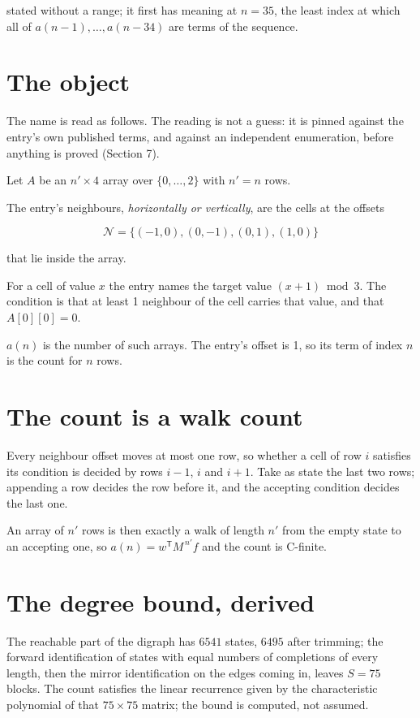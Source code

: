 \documentclass[11pt]{article}
\theoremstyle{definition}
\begin{document}
stated without a range; it first has meaning at $n = 35$, the least index at which all of $a(n-1),\dots,a(n-34)$ are terms of the sequence.

\section{The object}

The name is read as follows. The reading is not a guess: it is pinned against the entry's own published terms, and against an independent enumeration, before anything is proved (Section 7).

Let $A$ be an $n' \times 4$ array over $\{0,\dots,2\}$ with $n' = n$ rows.

The entry's neighbours, {\itshape horizontally or vertically}, are the cells at the offsets

\[\mathcal{N} = \{(-1,0), (0,-1), (0,1), (1,0)\}\]

that lie inside the array.

For a cell of value $x$ the entry names the target value $(x + 1) \bmod 3$. The condition is that at least 1 neighbour of the cell carries that value, and that $A[0][0] = 0$.

$a(n)$ is the number of such arrays. The entry's offset is 1, so its term of index $n$ is the count for $n$ rows.

\section{The count is a walk count}

Every neighbour offset moves at most one row, so whether a cell of row $i$ satisfies its condition is decided by rows $i-1$, $i$ and $i+1$. Take as state the last two rows; appending a row decides the row before it, and the accepting condition decides the last one.

An array of $n'$ rows is then exactly a walk of length $n'$ from the empty state to an accepting one, so $a(n) = w^{\mathsf T}M^{\,n'}f$ and the count is C-finite.

\section{The degree bound, derived}

The reachable part of the digraph has $6541$ states, $6495$ after trimming; the forward identification of states with equal numbers of completions of every length, then the mirror identification on the edges coming in, leaves $S = 75$ blocks. The count satisfies the linear recurrence given by the characteristic polynomial of that $75\times75$ matrix; the bound is computed, not assumed.
\end{document}
